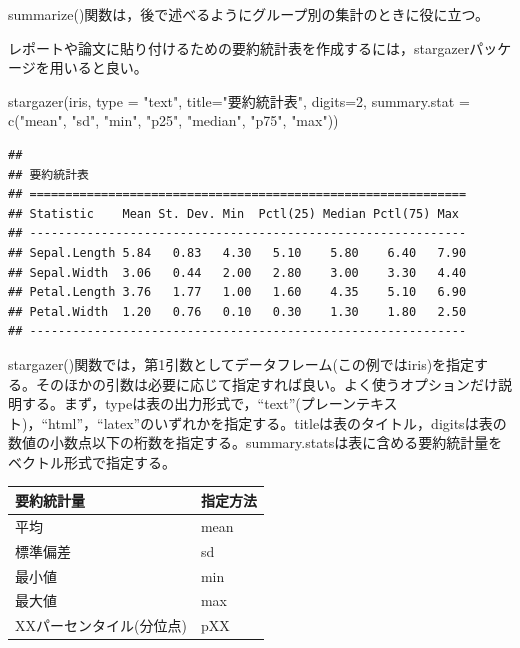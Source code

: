 \documentclass[
]{book}
\newenvironment{Shaded}{\begin{snugshade}}{\end{snugshade}}
\newcommand{\AttributeTok}[1]{\textcolor[rgb]{0.77,0.63,0.00}{#1}}
\newcommand{\DecValTok}[1]{\textcolor[rgb]{0.00,0.00,0.81}{#1}}
\newcommand{\FunctionTok}[1]{\textcolor[rgb]{0.00,0.00,0.00}{#1}}
\newcommand{\NormalTok}[1]{#1}
\newcommand{\StringTok}[1]{\textcolor[rgb]{0.31,0.60,0.02}{#1}}
\begin{document}
summarize()関数は，後で述べるようにグループ別の集計のときに役に立つ。

レポートや論文に貼り付けるための要約統計表を作成するには，stargazerパッケージを用いると良い。

\begin{Shaded}
\begin{Highlighting}[]
\FunctionTok{stargazer}\NormalTok{(iris, }\AttributeTok{type =} \StringTok{"text"}\NormalTok{, }\AttributeTok{title=}\StringTok{"要約統計表"}\NormalTok{, }\AttributeTok{digits=}\DecValTok{2}\NormalTok{,}
          \AttributeTok{summary.stat =} \FunctionTok{c}\NormalTok{(}\StringTok{"mean"}\NormalTok{, }\StringTok{"sd"}\NormalTok{, }\StringTok{"min"}\NormalTok{, }\StringTok{"p25"}\NormalTok{, }\StringTok{"median"}\NormalTok{, }\StringTok{"p75"}\NormalTok{, }\StringTok{"max"}\NormalTok{))}
\end{Highlighting}
\end{Shaded}

\begin{verbatim}
## 
## 要約統計表
## =============================================================
## Statistic    Mean St. Dev. Min  Pctl(25) Median Pctl(75) Max 
## -------------------------------------------------------------
## Sepal.Length 5.84   0.83   4.30   5.10    5.80    6.40   7.90
## Sepal.Width  3.06   0.44   2.00   2.80    3.00    3.30   4.40
## Petal.Length 3.76   1.77   1.00   1.60    4.35    5.10   6.90
## Petal.Width  1.20   0.76   0.10   0.30    1.30    1.80   2.50
## -------------------------------------------------------------
\end{verbatim}

stargazer()関数では，第1引数としてデータフレーム(この例ではiris)を指定する。そのほかの引数は必要に応じて指定すれば良い。よく使うオプションだけ説明する。まず，typeは表の出力形式で，``text''(プレーンテキスト)，``html''，``latex''のいずれかを指定する。titleは表のタイトル，digitsは表の数値の小数点以下の桁数を指定する。summary.statsは表に含める要約統計量をベクトル形式で指定する。

\begin{longtable}[]{@{}ll@{}}
\toprule
要約統計量 & 指定方法 \\
\midrule
\endhead
平均 & mean \\
標準偏差 & sd \\
最小値 & min \\
最大値 & max \\
XXパーセンタイル(分位点) & pXX \\
\bottomrule
\end{longtable}
\end{document}
